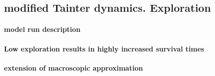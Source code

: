 
\subsection{modified Tainter dynamics. Exploration}

\paragraph{model run description}

\paragraph{Low exploration results in highly increased survival times}

\paragraph{extension of macroscopic approximation}
